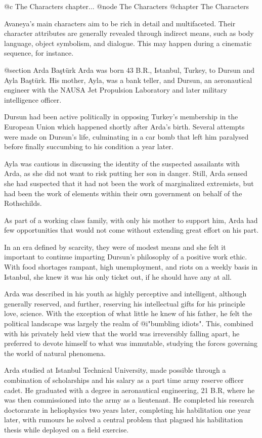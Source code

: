 @c The Characters chapter...
@node The Characters
@chapter The Characters

Avaneya's main characters aim to be rich in detail and multifaceted. Their character attributes are generally revealed through indirect means, such as body language, object symbolism, and dialogue. This may happen during a cinematic sequence, for instance.

@section Arda Baştürk
Arda was born 43 B.R., Istanbul, Turkey, to Dursun and Ayla Baştürk. His mother, Ayla, was a bank teller, and Dursun, an aeronautical engineer with the NAUSA Jet Propulsion Laboratory and later military intelligence officer.

Dursun had been active politically in opposing Turkey's membership in the European Union which happened shortly after Arda's birth. Several attempts were made on Dursun's life, culminating in a car bomb that left him paralysed before finally succumbing to his condition a year later.

Ayla was cautious in discussing the identity of the suspected assailants with Arda, as she did not want to risk putting her son in danger. Still, Arda sensed she had suspected that it had not been the work of marginalized extremists, but had been the work of elements within their own government on behalf of the Rothschilds.

As part of a working class family, with only his mother to support him, Arda had few opportunities that would not come without extending great effort on his part. 

In an era defined by scarcity, they were of modest means and she felt it important to continue imparting Dursun's philosophy of a positive work ethic. With food shortages rampant, high unemployment, and riots on a weekly basis in Istanbul, she knew it was his only ticket out, if he should have any at all.

Arda was described in his youth as highly perceptive and intelligent, although generally reserved, and further, reserving his intellectual gifts for his principle love, science. With the exception of what little he knew of his father, he felt the political landscape was largely the realm of @i{"bumbling idiots"}. This, combined with his privately held view that the world was irreversibly falling apart, he preferred to devote himself to what was immutable, studying the forces governing the world of natural phenomena.

Arda studied at Istanbul Technical University, made possible through a combination of scholarships and his salary as a part time army reserve officer cadet. He graduated with a degree in aeronautical engineering, 21 B.R, where he was then commissioned into the army as a lieutenant. He completed his research doctorarate in heliophysics two years later, completing his habilitation one year later, with rumours he solved a central problem that plagued his habilitation thesis while deployed on a field exercise.

